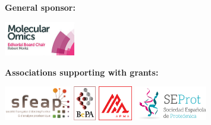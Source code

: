 \documentclass[a5paper,10pt,oneside]{article}
\begin{document}
\vspace*{.5cm}
\noindent\textbf{General sponsor:}
\begin{center}
  \includegraphics[height=1.5cm]{graphics/Molecular-Omics_logo}
\end{center}
\vspace*{.5cm}
\noindent\textbf{Associations supporting with grants:}
\begin{center}
  \includegraphics[height=1.5cm]{graphics/logo_sfeap}\hspace*{1cm}
  \includegraphics[height=1.5cm]{graphics/BePA_Logo}\hspace*{1cm}
  \includegraphics[height=1.5cm]{graphics/apma_red-white_box_logo_1k}\hspace*{1cm}
  \includegraphics[height=1.5cm]{graphics/LOGO_GANADOR_SEPROT_2016}
\end{center}
\end{document}
